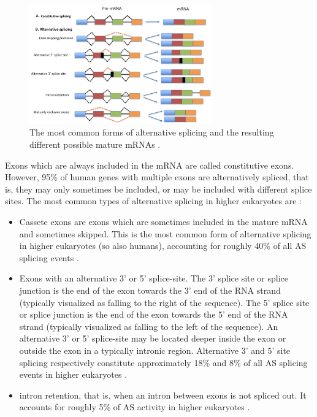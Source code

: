 \begin{figure}[h]
	\centering\includegraphics[width=0.7\textwidth]{../visualizations/ch2-biobackground/alternative_splicing_forms.png} 
	\caption
	{The most common forms of alternative splicing and the resulting different possible mature mRNAs \cite{img:altsplicingforms}.
	}
	\label{fig:altsplicingforms}
\end{figure}

Exons which are always included in the mRNA are called constitutive exons. However, 95\% of human genes with multiple exons are alternatively spliced, that is, they may only sometimes be included, or may be included with different splice sites. The most common types of alternative splicing in higher eukaryotes are \cite{commonsplicing1}\cite{commonsplicing2}:

\begin{itemize}
\item Cassete exons are exons which are sometimes included in the mature mRNA and sometimes skipped. This is the most common form of alternative splicing in higher eukaryotes (so also humans), accounting for roughly 40\% of all AS splicing events \cite{splicing_current_perspectives}.
\item Exons with an alternative 3' or 5' splice-site. The 3' splice site or splice junction is the end of the exon towards the 3' end of the RNA strand (typically visualized as falling to the right of the sequence). The 5' splice site or splice junction is the end of the exon towards the 5' end of the RNA strand (typically visualized as falling to the left of the sequence). An alternative 3' or 5' splice-site may be located deeper inside the exon or outside the exon in a typically intronic region. Alternative 3' and 5' site splicing respectively constitute approximately 18\% and 8\% of all AS splicing events in higher eukaryotes \cite{splicing_current_perspectives}. 
\item intron retention, that is, when an intron between exons is not spliced out. It accounts for roughly 5\% of AS activity in higher eukaryotes \cite{splicing_current_perspectives}.
\end{itemize}


